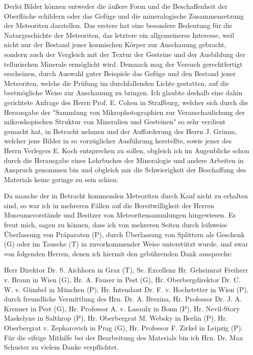 \documentclass[a4paper, 12pt, oneside]{article}
\begin{document}
Derlei Bilder können entweder die äußere Form und die Beschaffenheit der Oberfläche schildern oder das Gefüge und die mineralogische Zusammensetzung der Meteoriten darstellen. Das erstere hat eine besondere Bedeutung für die Naturgeschichte der Meteoriten, das letztere ein allgemeineres Interesse, weil nicht nur der Bestand jener kosmischen Körper zur Anschauung gebracht, sondern auch der Vergleich mit der Textur der Gesteine und der Ausbildung der tellurischen Minerale ermöglicht wird. Demnach mag der Versuch gerechtfertigt erscheinen, durch Auswahl guter Beispiele das Gefüge und den Bestand jener Meteoriten, welche die Prüfung im durchfallenden Lichte gestatten, auf die bestmögliche Weise zur Anschauung zu bringen. Ich glaubte deshalb eine dahin gerichtete Anfrage des Herrn Prof. E. Cohen in Straßburg, welcher sich durch die Herausgabe der "Sammlung von Mikrophotographien zur Veranschaulichung der mikroskopischen Struktur von Mineralien und Gesteinen" so sehr verdient gemacht hat, in Betracht nehmen und der Aufforderung des Herrn J. Grimm, welcher jene Bilder in so vorzüglicher Ausführung herstellte, sowie jener des Herrn Verlegers E. Koch entsprechen zu sollen, obgleich ich im Augenblicke schon durch die Herausgabe eines Lehrbuches der Mineralogie und andere Arbeiten in Anspruch genommen bin und obgleich mir die Schwierigkeit der Beschaffung des Materials keine geringe zu sein schien.

Da manche der in Betracht kommenden Meteoriten durch Kauf nicht zu erhalten sind, so war ich in mehreren Fällen auf die Bereitwilligkeit der Herren Museumsvorstände und Besitzer von Meteoritensammlungen hingewiesen. Es freut mich, sagen zu können, dass ich von mehreren Seiten durch leihweise Überlassung von Präparaten (P), durch Überlassung von Splittern als Geschenk (G) oder im Tausche (T) in zuvorkommender Weise unterstützt wurde, und zwar von folgenden Herren, denen ich hiermit den gebührenden Dank ausspreche:

Herr Direktor Dr. S. Aichhorn in Graz (T), Se. Excellenz Hr. Geheimrat Freiherr v. Braun in Wien (G), Hr. A. Fauser in Pest (G), Hr. Oberbergdirektor Dr. C. W. v. Gümbel in München (P), Hr. Intendant Dr. F. v. Hochstetter in Wien (P), durch freundliche Vermittlung des Hrn. Dr. A. Brezina, Hr. Professor Dr. J. A. Krenner in Pest (G), Hr. Professor A. v. Lasaulx in Bonn (P), Hr. Nevil-Story Maskelyne in Salthrop (P), Hr. Oberbergrat M. Websky in Berlin (P), Hr. Oberbergrat v. Zepharovich in Prag (G), Hr. Professor F. Zirkel in Leipzig (P). Für die eifrige Mithilfe bei der Bearbeitung des Materials bin ich Hrn. Dr. Max Schuster zu vielem Danke verpflichtet.
\end{document}
